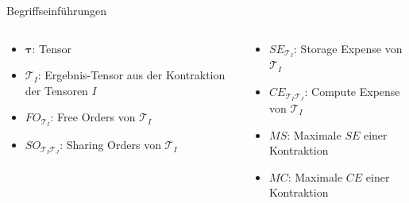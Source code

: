 \documentclass{beamer}
\newcommand{\Tau}{\bm{\mathcal{T}}}
\newcommand{\tauB}{\bm{\tau}}
\begin{document}

\begin{frame}{Begriffseinführungen}
	\begin{columns}
		\begin{column}{0.5\textwidth}
			\begin{itemize}
				\item $\tauB$: Tensor
				\item $\Tau_I$: Ergebnis-Tensor aus der Kontraktion der Tensoren $I$
				\item $FO_{\Tau_I}$: Free Orders von $\Tau_I$
				\item $SO_{\Tau_I\Tau_J}$: Sharing Orders von $\Tau_I$
			\end{itemize}
		\end{column}
		\begin{column}{0.5\textwidth}
			\begin{itemize}
				\item $SE_{\Tau_I}$: Storage Expense von $\Tau_I$
				\item $CE_{\Tau_I\Tau_J}$: Compute Expense von $\Tau_I$
				\item $MS$: Maximale $SE$ einer Kontraktion
				\item $MC$: Maximale $CE$ einer Kontraktion
			\end{itemize}
		\end{column}
	\end{columns}
\end{frame}
\end{document}
